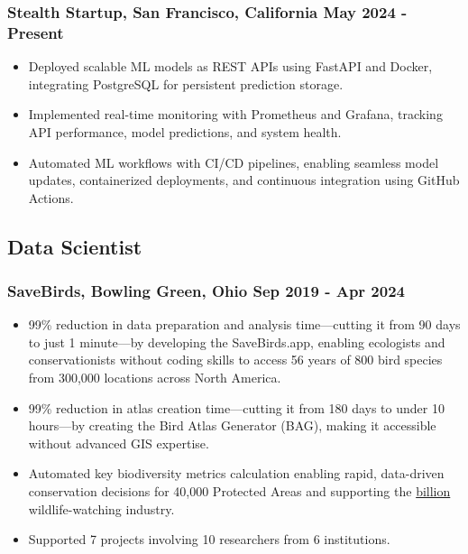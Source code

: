 \documentclass[11pt]{article} %
\begin{document}
\subsubsection{Stealth Startup, San Francisco, California \hfill May 2024 - Present}
\begin{itemize}[itemsep=5pt]
	\item Deployed scalable ML models as REST APIs using FastAPI and Docker, integrating PostgreSQL for persistent prediction storage.
	\item Implemented real-time monitoring with Prometheus and Grafana, tracking API performance, model predictions, and system health. 
	\item Automated ML workflows with CI/CD pipelines, enabling seamless model updates, containerized deployments, and continuous integration using GitHub Actions.
\end{itemize}

\subsection{Data Scientist}
\subsubsection{SaveBirds, Bowling Green, Ohio \hfill Sep 2019 - Apr 2024}
\begin{itemize}[itemsep=5pt]
	\item 99\% reduction in data preparation and analysis time—cutting it from 90 days to just 1 minute—by developing the SaveBirds.app, enabling ecologists and conservationists without coding skills to access 56 years of 800 bird species from 300,000 locations across North America.
	\item 99\% reduction in atlas creation time—cutting it from 180 days to under 10 hours—by creating the Bird Atlas Generator (BAG), making it accessible without advanced GIS expertise.
	\item Automated key biodiversity metrics calculation enabling rapid, data-driven conservation decisions for 40,000 Protected Areas and supporting the \href{https://www.usgs.gov/centers/eesc/science/north-american-breeding-bird-survey#:~:text=common\%20and\%20helping-,fuel\%20a\%20\%2475\%20billion\%20wildlife\%20watching\%20industry,-.}{ billion} wildlife-watching industry.
	\item Supported 7 projects involving 10 researchers from 6 institutions.
\end{itemize}
\end{document}
